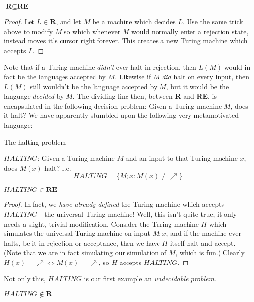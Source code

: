 \begin{fact}
    $\textbf{R} \subseteq \textbf{RE}$
\end{fact}
\begin{proof}
    Let $L \in \textbf{R}$, and let $M$ be a machine which decides $L$. Use the same trick above to modify $M$ so which whenever $M$ would normally enter a rejection state, instead moves it's cursor right forever. This creates a new Turing machine which accepts $L$. 
\end{proof}
\par Note that if a Turing machine \textit{didn't} ever halt in rejection, then $L(M)$ would in fact be the languages accepted by $M$. Likewise if $M$ \textit{did} halt on every input, then $L(M)$ still wouldn't be the language accepted by $M$, but it would be the language \textit{decided} by $M$. The dividing line then, between \textbf{R} and \textbf{RE}, is encapsulated in the following decision problem: Given a Turing machine $M$, does it halt? We have apparently stumbled upon the following very metamotivated language:
\begin{problem} The halting problem
    \begin{center}
        $HALTING$: Given a Turing machine $M$ and an input to that Turing machine $x$, does $M(x)$ halt? I.e.
        \[HALTING = \{M;x: M(x) \neq \nearrow\} \]
    \end{center}
\end{problem}
\begin{fact}
    $HALTING \in \textbf{RE}$  
\end{fact}
\begin{proof}
    In fact, we \textit{have already defined } the Turing machine which accepts $HALTING$ - the universal Turing machine! Well, this isn't quite true, it only needs a slight, trivial modification. Consider the Turing machine $H$ which simulates the universal Turing machine on input $M;x$, and if the machine ever halts, be it in rejection or acceptance, then we have $H$ itself halt and accept. (Note that we are in fact simulating our simulation of $M$, which is fun.) Clearly $H(x) = \nearrow \iff M(x) = \nearrow$, so $H$ accepts $HALTING$.
\end{proof}
Not only this, $HALTING$ is our first example an \textit{undecidable problem}. 
\begin{theorem}
    $HALTING \notin \textbf{R}$
\end{theorem}
